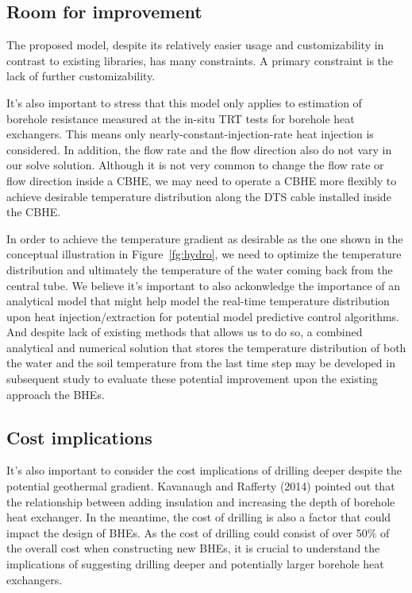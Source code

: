 \subsection{Room for improvement}
	The proposed model, despite its relatively easier usage and customizability in contrast to existing libraries, has many constraints. A primary constraint is the lack of further customizability.
	
	It's also important to stress that this model only applies to estimation of borehole resistance measured at the in-situ TRT tests for borehole heat exchangers. This means only nearly-constant-injection-rate heat injection is considered. In addition, the flow rate and the flow direction also do not vary in our solve solution. Although it is not very common to change the flow rate or flow direction inside a CBHE, we may need to operate a CBHE more flexibly to achieve desirable temperature distribution along the DTS cable installed inside the CBHE.
	
	In order to achieve the temperature gradient as desirable as the one shown in the conceptual illustration in Figure~\ref{fg:hydro}, we need to optimize the temperature distribution and ultimately the temperature of the water coming back from the central tube. We believe it's important to also ackonwledge the importance of an analytical model that might help model the real-time temperature distribution upon heat injection/extraction for potential model predictive control algorithms. And despite lack of existing methods that allows us to do so, a combined analytical and numerical solution that stores the temperature distribution of both the water and the soil temperature from the last time step may be developed in subsequent study to evaluate these potential improvement upon the existing approach the BHEs. 
	  
\subsection{Cost implications}
	It's also important to consider the cost implications of drilling deeper despite the potential geothermal gradient. Kavanaugh and Rafferty (2014) pointed out that the relationship between adding insulation and increasing the depth of borehole heat exchanger. In the meantime, the cost of drilling is also a factor that could impact the design of BHEs. As the cost of drilling could consist of over 50\% of the overall cost when constructing new BHEs, it is crucial to understand the implications of suggesting drilling deeper and potentially larger borehole heat exchangers.

